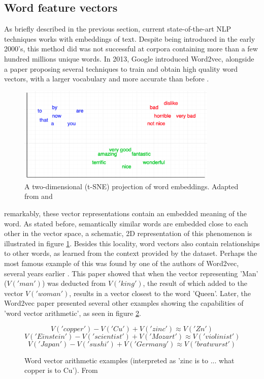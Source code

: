 \documentclass[twoside]{uva-inf-bachelor-thesis}
\begin{document}
\subsection{Word feature vectors}
As briefly described in the previous section, current state-of-the-art NLP techniques works with embeddings of text. Despite being introduced in the early 2000's, this method did was not successful at corpora containing more than a few hundred millions unique words. In 2013, Google introduced Word2vec, alongside a paper proposing several techniques to train and obtain high quality word vectors, with a larger vocabulary and more accurate than before \cite{mikolov13}.


\begin{figure}
    \centering
    \includegraphics[width=0.85\textwidth]{images/embeddings.png}
    \caption{A two-dimensional (t-SNE) projection of word embeddings. Adapted from \cite{Manning99} and \cite{li16}}
    \label{fig:embeddings}
\end{figure}

remarkably, these vector representations contain an embedded meaning of the word. As stated before, semantically similar words are embedded close to each other in the vector space, a schematic, 2D representation of this phenomenon is illustrated in figure \ref{fig:embeddings}. Besides this locality, word vectors also contain relationships to other words, as learned from the context provided by the dataset. Perhaps the most famous example of this was found by one of the authors of Word2vec, several years earlier \cite{mikolov13_2}. This paper showed that when the vector representing 'Man' ($V('man')$) was deducted from $V('king')$, the result of which added to the vector $V('woman')$, results in a vector closest to the word 'Queen'. Later, the Word2vec paper presented several other examples showing the capabilities of 'word vector arithmetic', as seen in figure \ref{fig:vecarith}.
\begin{figure}[h]
    \centering
    $$V('copper') - V('Cu') + V('zinc') \approx V('Zn')$$
    $$V('Einstein') - V('scientist') + V('Mozart') \approx V('violinist')$$
    $$V('Japan') - V('sushi') + V('Germany') \approx V('bratwurst')$$
    \caption{Word vector arithmetic examples (interpreted as 'zinc is to ... what copper is to Cu'). From \cite{mikolov13}}
    \label{fig:vecarith}
\end{figure}
\end{document}
